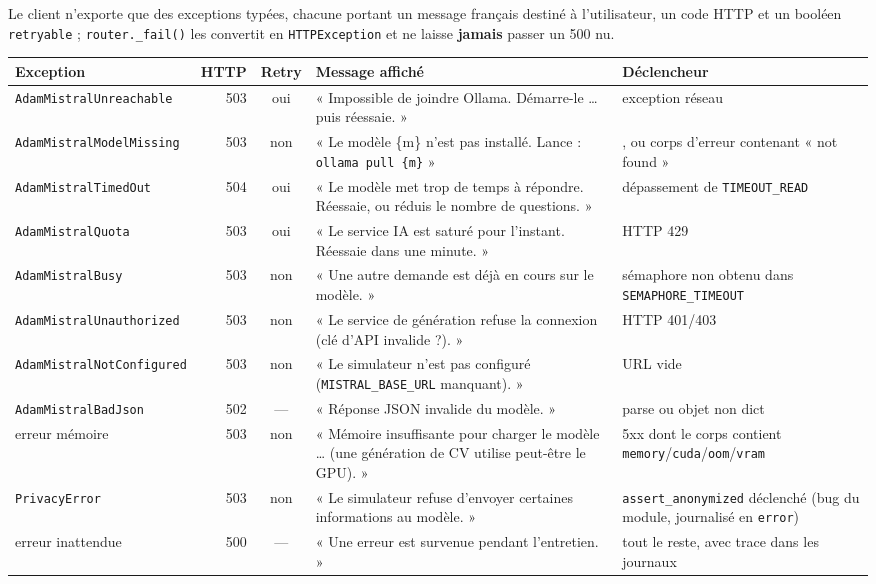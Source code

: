 Le client n'exporte que des exceptions typées, chacune portant un message
français destiné à l'utilisateur, un code HTTP et un booléen
\texttt{retryable} ; \texttt{router.\_fail()} les convertit en
\texttt{HTTPException} et ne laisse \textbf{jamais} passer un 500 nu.

\begin{small}
\begin{longtable}{@{}>{\cellflush}p{4.7cm} r c
                  >{\cellflush}p{3.2cm}
                  >{\cellflush}p{3.0cm}@{}}
\toprule
\textbf{Exception} & \textbf{HTTP} & \textbf{Retry} & \textbf{Message affiché} & \textbf{Déclencheur} \\
\midrule
\endhead
\bottomrule
\endlastfoot
\texttt{AdamMistralUnreachable}        & 503 & oui & « Impossible de joindre Ollama. Démarre-le \ldots{} puis réessaie. » & exception réseau \\
\texttt{AdamMistralModelMissing}       & 503 & non & « Le modèle \{m\} n'est pas installé. Lance : \texttt{ollama pull \{m\}} » & 404, ou corps d'erreur contenant « not found » \\
\texttt{AdamMistralTimedOut}           & 504 & oui & « Le modèle met trop de temps à répondre. Réessaie, ou réduis le nombre de questions. » & dépassement de \texttt{TIMEOUT\_READ} \\
\texttt{AdamMistralQuota}              & 503 & oui & « Le service IA est saturé pour l'instant. Réessaie dans une minute. » & HTTP 429 \\
\texttt{AdamMistralBusy}               & 503 & non & « Une autre demande est déjà en cours sur le modèle. » & sémaphore non obtenu dans \texttt{SEMAPHORE\_TIMEOUT} \\
\texttt{AdamMistralUnauthorized}       & 503 & non & « Le service de génération refuse la connexion (clé d'API invalide ?). » & HTTP 401/403 \\
\texttt{AdamMistralNotConfigured}      & 503 & non & « Le simulateur n'est pas configuré (\texttt{MISTRAL\_BASE\_URL} manquant). » & URL vide \\
\texttt{AdamMistralBadJson}            & 502 & --- & « Réponse JSON invalide du modèle. » & parse ou objet non dict \\
erreur mémoire                         & 503 & non & « Mémoire insuffisante pour charger le modèle \ldots{} (une génération de CV utilise peut-être le GPU). » & 5xx dont le corps contient \texttt{memory}/\allowbreak \texttt{cuda}/\allowbreak \texttt{oom}/\allowbreak \texttt{vram} \\
\texttt{PrivacyError}                  & 503 & non & « Le simulateur refuse d'envoyer certaines informations au modèle. » & \texttt{assert\_anonymized} déclenché (bug du module, journalisé en \texttt{error}) \\
erreur inattendue                      & 500 & --- & « Une erreur est survenue pendant l'entretien. » & tout le reste, avec trace dans les journaux \\
\end{longtable}
\end{small}

